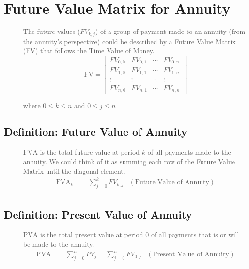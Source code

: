 \documentclass{article} %
\newcommand{\FVA}{\mathrm{FVA}} %
\newcommand{\PVA}{\mathrm{PVA}} %
\newcommand{\FV}{\mathrm{FV}} %
\begin{document}
\section{Future Value Matrix for Annuity}
\begin{quote}
    The future values ($FV_{k, j}$) of a group of payment made to an annuity (from the annuity's perspective) could be described by a Future Value Matrix (FV) that follows the Time Value of Money.
    \[
        \FV =
        \begin{bmatrix}
            FV_{0,0} & FV_{0,1} & \cdots & FV_{0,n} \\
            FV_{1,0} & FV_{1,1} & \cdots & FV_{1,n} \\
            \vdots   & \vdots   & \ddots & \vdots   \\
            FV_{n,0} & FV_{n,1} & \cdots & FV_{n,n}
        \end{bmatrix}
    \]

    where $0 \leq k \leq n$ and  $0 \leq j \leq n$
\end{quote}

\subsection{Definition: Future Value of Annuity}

\begin{quote}
    $\FVA$ is the total future value at period $k$ of all payments made to the annuity. We could think of it as summing each row of the Future Value Matrix until the diagonal element.
    \begin{align*}
        \FVA_{k} & = \sum_{j = 0}^{k} FV_{k, j} & (\text{Future Value of Annuity}) \\
    \end{align*}
\end{quote}

\subsection{Definition: Present Value of Annuity}
\begin{quote}
    $\PVA$ is the total present value at period 0 of all payments that is or will be made to the annuity.
    \begin{align*}
        \PVA & = \sum_{j = 0}^{n} PV_{j} = \sum_{j = 0}^{n} FV_{0, j} & (\text{Present Value of Annuity}) \\
    \end{align*}
\end{quote}
\end{document}
